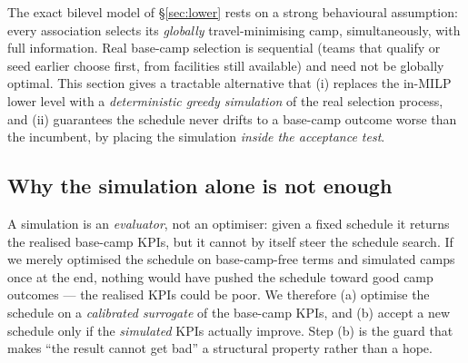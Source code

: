\documentclass[12pt, letterpaper]{article}
\begin{document}
The exact bilevel model of \S\ref{sec:lower} rests on a strong behavioural
assumption: every association selects its \emph{globally}
travel-minimising camp, simultaneously, with full information. Real
base-camp selection is sequential (teams that qualify or seed earlier
choose first, from facilities still available) and need not be globally
optimal. This section gives a tractable alternative that (i) replaces the
in-MILP lower level with a \emph{deterministic greedy simulation} of the
real selection process, and (ii) guarantees the schedule never drifts to
a base-camp outcome worse than the incumbent, by placing the simulation
\emph{inside the acceptance test}.

\subsection{Why the simulation alone is not enough}
A simulation is an \emph{evaluator}, not an optimiser: given a fixed
schedule it returns the realised base-camp KPIs, but it cannot by itself
steer the schedule search. If we merely optimised the schedule on
base-camp-free terms and simulated camps once at the end, nothing would
have pushed the schedule toward good camp outcomes --- the realised KPIs
could be poor. We therefore (a) optimise the schedule on a
\emph{calibrated surrogate} of the base-camp KPIs, and (b) accept a new
schedule only if the \emph{simulated} KPIs actually improve. Step (b) is
the guard that makes ``the result cannot get bad'' a structural property
rather than a hope.
\end{document}
